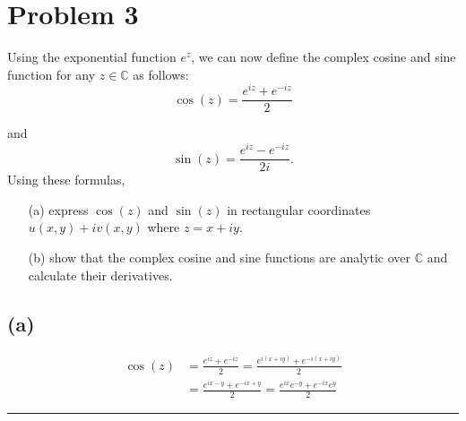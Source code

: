 \documentclass{article}
\begin{document}
\newpage
\section*{Problem 3}
Using the exponential function $e^{z}$, we can now define the complex cosine and sine function for any $z \in \mathbb{C}$ as follows:
\[  \cos(z) = \frac{e^{iz} + e^{-iz}}{2} \]

and
\[  \sin(z) = \frac{e^{iz} - e^{-iz}}{2i}. \]
Using these formulas,
\begin{enumerate}
	\item[(a)] express $\cos(z)$ and $\sin(z)$ in rectangular coordinates $u(x,y) + iv (x,y)$ where $z = x + iy$.
	\item[(b)] show that the complex cosine and sine functions are analytic over $\mathbb{C}$ and calculate their derivatives.
\end{enumerate}

\subsection*{(a)}
\begin{align*}
  \cos(z) &= \frac{e^{iz} + e^{-iz}}{2}  = \frac{e^{i(x+iy)} + e^{-i(x+iy)}}{2} \\
  &= \frac{e^{ix-y} + e^{-ix+y}}{2} = \frac{e^{ix}e^{-y} + e^{-ix}e^{y}}{2}
\end{align*}
\vspace{.5cm} %

\hrule

\end{document}
